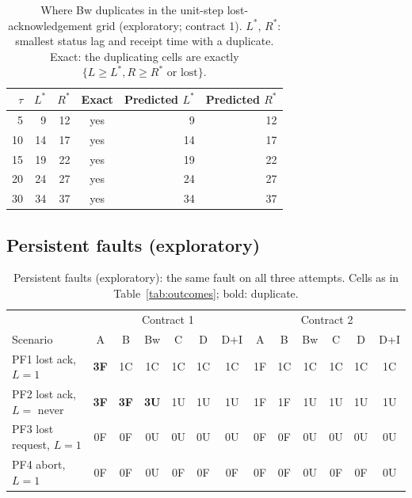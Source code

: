 \documentclass[11pt]{article}
\begin{document}
\begin{table}[!htbp]
\centering
\small
\caption{Where Bw duplicates in the unit-step lost-acknowledgement grid (exploratory; contract 1). $L^*$, $R^*$: smallest status lag and receipt time with a duplicate. Exact: the duplicating cells are exactly $\{L \geq L^*, R \geq R^* \text{ or lost}\}$.}
\label{tab:bw}
\begin{tabular}{@{}rrrcrr@{}}
\toprule
$\tau$ & $L^*$ & $R^*$ & Exact & Predicted $L^*$ & Predicted $R^*$ \\
\midrule
5 & 9 & 12 & yes & 9 & 12 \\
10 & 14 & 17 & yes & 14 & 17 \\
15 & 19 & 22 & yes & 19 & 22 \\
20 & 24 & 27 & yes & 24 & 27 \\
30 & 34 & 37 & yes & 34 & 37 \\
\bottomrule
\end{tabular}
\end{table}

\subsection{Persistent faults (exploratory)}\label{sec:pf}

\begin{table}[!htbp]
\centering
\footnotesize
\setlength{\tabcolsep}{3pt}
\caption{Persistent faults (exploratory): the same fault on all three attempts. Cells as in Table~\ref{tab:outcomes}; bold: duplicate.}
\label{tab:pf}
\begin{tabular}{@{}l*{6}{c}|*{6}{c}@{}}
\toprule
 & \multicolumn{6}{c|}{Contract 1} & \multicolumn{6}{c}{Contract 2} \\
Scenario & A & B & Bw & C & D & D+I & A & B & Bw & C & D & D+I \\
\midrule
PF1 lost ack, $L=1$ & \textbf{3F} & 1C & 1C & 1C & 1C & 1C & 1F & 1C & 1C & 1C & 1C & 1C \\
PF2 lost ack, $L=$ never & \textbf{3F} & \textbf{3F} & \textbf{3U} & 1U & 1U & 1U & 1F & 1F & 1U & 1U & 1U & 1U \\
PF3 lost request, $L=1$ & 0F & 0F & 0U & 0U & 0U & 0U & 0F & 0F & 0U & 0U & 0U & 0U \\
PF4 abort, $L=1$ & 0F & 0F & 0U & 0F & 0F & 0F & 0F & 0F & 0U & 0F & 0F & 0U \\
\bottomrule
\end{tabular}
\end{table}
\end{document}
